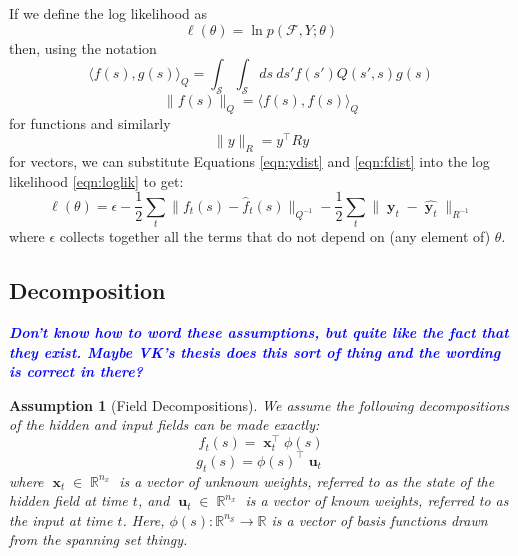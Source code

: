 \documentclass{IEEEtran}
\newcommand{\todo}[1]{\textsf{\emph{\textbf{\textcolor{blue}{#1}}}}}
\newcommand{\inner}[3]{\langle#1,#2\rangle_{#3}}
\newcommand{\dist}[2]{\|#1\|_{#2}}
\DeclareMathOperator{\R}{\mathbb{R}}
\DeclareMathOperator{\xvec}{\mathbf{x}}
\DeclareMathOperator{\uvec}{\mathbf{u}}
\DeclareMathOperator{\yvec}{\mathbf{y}}
\DeclareMathOperator{\onto}{\rightarrow}
\newtheorem{assumption}{Assumption}
\begin{document}
If we define the log likelihood as
\begin{equation}
	\label{eqn:loglik}
	\ell(\theta) = \ln p(\mathcal{F}, Y;\theta)
\end{equation}
then, using the notation
\begin{equation}
	\inner{f(s)}{g(s)}{Q} = \int_\mathcal{S} \int_\mathcal{S} ds~ds' f(s') Q(s',s) g(s)
\end{equation}
\begin{equation}
	\dist{f(s)}{Q} = \inner{f(s)}{f(s)}{Q}
\end{equation}
for functions and similarly
\begin{equation}
	\dist{y}{R} = y^\top Ry
\end{equation}
for vectors, we can substitute Equations \ref{eqn:ydist} and \ref{eqn:fdist} into the log likelihood \ref{eqn:loglik} to get:
\begin{equation}
	\ell(\theta) =  \epsilon  - \frac{1}{2}\sum_t\dist{f_t(s) - \hat{f}_t(s)}{Q^{-1}} - \frac{1}{2}\sum_t\dist{\yvec_t-\hat{\yvec_t}}{R^{-1}}
\end{equation}
where $\epsilon$ collects together all the terms that do not depend on (any element of) $\theta$.

\subsection{Decomposition}

\todo{Don't know how to word these assumptions, but quite like the fact that they exist. Maybe VK's thesis does this sort of thing and the wording is correct in there?}

\begin{assumption}[Field Decompositions]
	\label{ass:fielddecomp}
	We assume the following decompositions of the hidden and input fields can be made exactly:
\begin{equation}
	\label{eq:f decomp}
	f_t(s) = \xvec_t^\top\phi(s)
\end{equation}
\begin{equation}
	g_t(s) = \phi(s)^\top\uvec_t
\end{equation}	 
where $\xvec_t \in \R^{n_x}$ is a vector of unknown weights, referred to as the state of the hidden field at time $t$, and $\uvec_t \in \R^{n_x}$ is a vector of known weights, referred to as the input at time $t$. Here, $\phi(s) : \mathbb{R}^{n_\mathcal{S}} \onto \mathbb{R}$ is a vector of basis functions drawn from the spanning set thingy.
\end{assumption}
\end{document}
